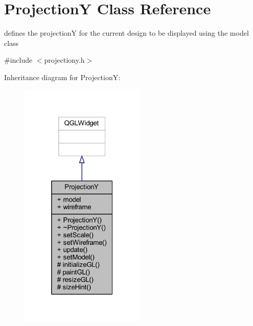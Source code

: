\hypertarget{class_projection_y}{}\section{ProjectionY Class Reference}
\label{class_projection_y}


defines the projectionY for the current design to be displayed using the model class  




{\ttfamily \#include $<$projectiony.\+h$>$}



Inheritance diagram for ProjectionY\+:\nopagebreak
\begin{figure}[H]
\begin{center}
\leavevmode
\includegraphics[width=169pt]{class_projection_y__inherit__graph}
\end{center}
\end{figure}


